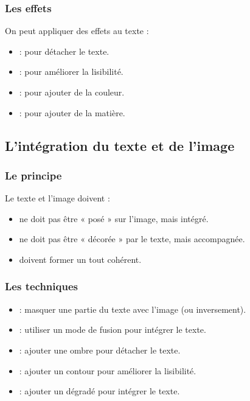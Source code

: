 \subsubsection{Les effets}

On peut appliquer des effets au texte :

\begin{itemize}
    \item {} : pour détacher le texte.
    \item {} : pour améliorer la lisibilité.
    \item {} : pour ajouter de la couleur.
    \item {} : pour ajouter de la matière.
\end{itemize}

\subsection{L'intégration du texte et de l'image}

\subsubsection{Le principe}

Le texte et l'image doivent  :

\begin{itemize}
    \item {} ne doit pas être « posé » sur l'image, mais intégré.
    \item {} ne doit pas être « décorée » par le texte, mais accompagnée.
    \item {} doivent former un tout cohérent.
\end{itemize}

\subsubsection{Les techniques}

\begin{itemize}
    \item {} : masquer une partie du texte avec l'image (ou inversement).
    \item {} : utiliser un mode de fusion pour intégrer le texte.
    \item {} : ajouter une ombre pour détacher le texte.
    \item {} : ajouter un contour pour améliorer la lisibilité.
    \item {} : ajouter un dégradé pour intégrer le texte.
\end{itemize}

